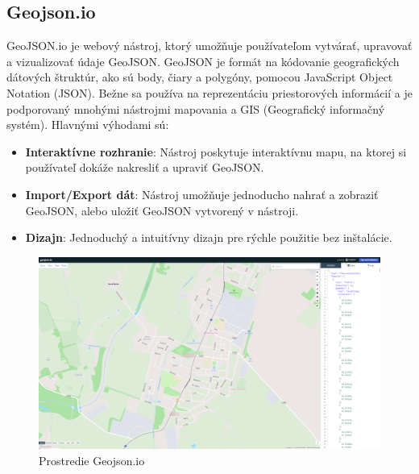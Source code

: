 \subsection{Geojson.io}
\indent \indent GeoJSON.io je webový nástroj, ktorý umožňuje používateľom vytvárať, upravovať a vizualizovať údaje GeoJSON. GeoJSON je formát na kódovanie geografických dátových štruktúr, ako sú body, čiary a polygóny, pomocou JavaScript Object Notation (JSON). Bežne sa používa na reprezentáciu priestorových informácií a je podporovaný mnohými nástrojmi mapovania a GIS (Geografický informačný systém). Hlavnými výhodami sú:
\begin{itemize}
    \item \textbf{Interaktívne rozhranie}: Nástroj poskytuje interaktívnu mapu, na ktorej si používateľ dokáže nakresliť a upraviť GeoJSON.
    \item \textbf{Import/Export dát}: Nástroj umožňuje jednoducho nahrať a zobraziť GeoJSON, alebo uložiť GeoJSON vytvorený v nástroji.
    \item \textbf{Dizajn}: Jednoduchý a intuitívny dizajn pre rýchle použitie bez inštalácie.
\end{itemize}
\begin{figure}[H]
    \centering
    \includegraphics[width = \linewidth]{img/geojson.png}
    \caption{Prostredie Geojson.io}
\end{figure}
